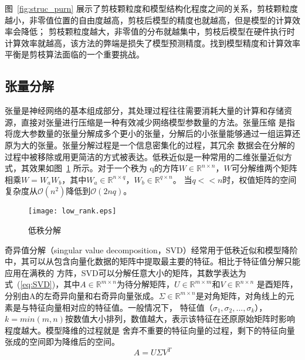 图~\ref{fig:struc_purn} 展示了剪枝颗粒度和模型结构化程度之间的关系，剪枝颗粒度越小，非零值位置的自由度越高，剪枝后模型的精度也就越高，但是模型的计算效率会降低；
剪枝颗粒度越大，非零值的分布就越集中，剪枝后模型在硬件执行时计算效率就越高，该方法的弊端是损失了模型预测精度。找到模型精度和计算效率平衡是剪枝算法面临的一个重要挑战。


\subsection{张量分解}
张量是神经网络的基本组成部分，其处理过程往往需要消耗大量的计算和存储资源，直接对张量进行压缩是一种有效减少网络模型参数量的方法。张量压缩
是指将庞大参数量的张量分解成多个更小的张量，分解后的小张量能够通过一组运算还原为大的张量。张量分解过程是一个信息密集化的过程，其冗余
数据会在分解的过程中被移除或用更简洁的方式被表达。低秩近似是一种常用的二维张量近似方式，其效果如图~\ref{fig:lowrank} 所示。对于一个秩为
q的方阵\(W \in \mathbb{R}^{n \times n}\)，\(W\)可分解维两个矩阵相乘\(W = W_a  W_b\)，其中\(W_a\in \mathbb{R}^{n \times q}\)，\(W_b \in \mathbb{R}^{q \times n}\)。
当\(q << n \)时，权值矩阵的空间复杂度从\(\mathcal{O}(n^2)\)降低到\(\mathcal{O}(2nq)\)。
\begin{figure}
	\centering
	\texttt{[image: low\_rank.eps]}
	\caption{低秩分解}
	\label{fig:lowrank}
\end{figure}

奇异值分解（singular value decomposition，SVD）经常用于低秩近似和模型降阶中，其可以从包含向量化数据的矩阵中提取最主要的特征。相比于特征值分解只能应用在满秩的
方阵，SVD可以分解任意大小的矩阵，其数学表达为式~(\ref{eq:SVD})，其中\(A \in \mathbb{R}^{m \times n}\)为待分解矩阵，\( U \in \mathbb{R}^{m \times m}\)和\( V \in \mathbb{R}^{n \times n}\)
是酉矩阵，分别由A的左奇异向量和右奇异向量张成。\(\Sigma \in \mathbb{R}^{m \times n}\)是对角矩阵，对角线上的元素是与特征向量相对应的特征值。一般情况下，
特征值（\(\sigma_1, \sigma_2,...,\sigma_k\)），\(k=min(m,n)\)按数值大小排列，数值越大，表示该特征在还原原始矩阵时影响程度越大。模型降维的过程就是
舍弃不重要的特征向量的过程，剩下的特征向量张成的空间即为降维后的空间。
\begin{equation}\label{eq:SVD}
	A = U  \Sigma   V^T
\end{equation}

